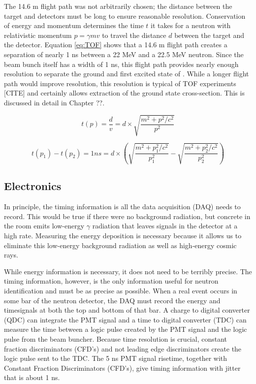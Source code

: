The 14.6 m flight path was not arbitrarily chosen; the distance between the target and detectors must be long to ensure reasonable resolution.  Conservation of energy and momentum determines the time $t$ it takes for a neutron with relativistic momentum $p = \gamma m v$ to travel the distance $d$ between the target and the detector. Equation \ref{eq:TOF} shows that a 14.6 m flight path creates a separation of nearly 1 ns between a 22 MeV and a 22.5 MeV neutron.  Since the beam bunch itself has a width of 1 ns, this flight path provides nearly enough resolution to separate the ground and first excited state of \GeTargets. While a longer flight path would improve resolution, this resolution is typical of TOF experiments [CITE] and certainly allows extraction of the ground state cross-section.  This is discussed in detail in Chapter ??.

\begin{equation}
t(p) = \frac{d}{v} = d\times\sqrt{\frac{m^2+p^2/c^2}{p^2}}
\end{equation}

\begin{equation}
t(p_1) - t(p_2) = 1 ns = d\times(\sqrt{\frac{m^2+p_1^2/c^2}{p_1^2}}-\sqrt{\frac{m^2+p_2^2/c^2}{p_2^2}})
\label{eq:TOF}
\end{equation}


\subsection{Electronics}

In principle, the timing information is all the data acquisition (DAQ) needs to record.  This would be true if there were no background radiation, but concrete in the room emits low-energy $\gamma$ radiation that leaves signals in the detector at a high rate.  Measuring the energy deposition is necessary because it allows us to eliminate this low-energy background radiation as well as high-energy cosmic rays.

While energy information is necessary, it does not need to be terribly precise.  The timing information, however, is the only information useful for neutron identification and must be as precise as possible. When a real event occurs in some bar of the neutron detector, the DAQ must record the energy and timesignals at both the top and bottom of that bar.  A charge to digital converter (QDC) can integrate the PMT signal and a time to digital converter (TDC) can measure the time between a logic pulse created by the PMT signal and the logic pulse from the beam buncher.  Because time resolution is crucial, constant fraction discriminators (CFD's) and not leading edge discriminators create the logic pulse sent to the TDC.  The 5 ns PMT signal risetime, together with Constant Fraction Discriminators (CFD's), give timing information with jitter that is about 1 ns.  

